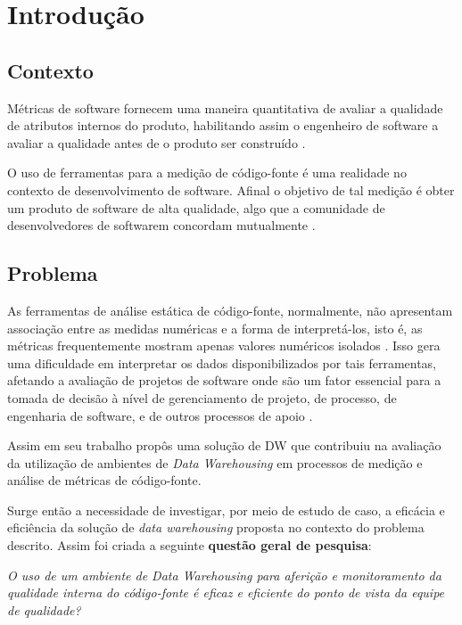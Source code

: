 \chapter{Introdução}
\label{chap:introdução}

\section {Contexto}

Métricas de software fornecem uma maneira quantitativa de avaliar a qualidade de atributos internos do produto, habilitando assim o engenheiro de software a avaliar a qualidade antes de o produto ser construído \cite{pressman_engenharia_2010}.

O uso de ferramentas para a medição de código-fonte é uma realidade no contexto de desenvolvimento de software. Afinal o objetivo de tal medição é obter um produto de software de alta qualidade, algo que a comunidade de desenvolvedores de softwarem concordam mutualmente \cite{pressman_engenharia_2010}.


\section{Problema}


As ferramentas de análise estática de código-fonte, normalmente, não apresentam associação entre as medidas numéricas e a forma de interpretá-los, isto é, as métricas frequentemente mostram apenas valores numéricos isolados \cite{Meirelles2013}.  Isso gera uma dificuldade em interpretar os dados disponibilizados por tais ferramentas, afetando a avaliação de projetos de software onde são um fator essencial para a tomada de decisão à nível de gerenciamento de projeto, de processo, de engenharia de software, e de outros processos de apoio \cite{pandian_software_2004}.

Assim  em seu trabalho propôs uma solução de DW que contribuiu na avaliação da utilização de ambientes de \textit{Data Warehousing} em processos de medição e análise de métricas de código-fonte. 

Surge então a necessidade de investigar, por meio de estudo de caso, a eficácia e eficiência da solução de \textit{data warehousing} proposta no contexto do problema descrito. Assim foi criada a seguinte \textbf{questão geral de pesquisa}:

\textit{O uso de um ambiente de Data Warehousing para aferição e monitoramento da qualidade interna do código-fonte é eficaz e eficiente do ponto de vista da equipe de qualidade?}


